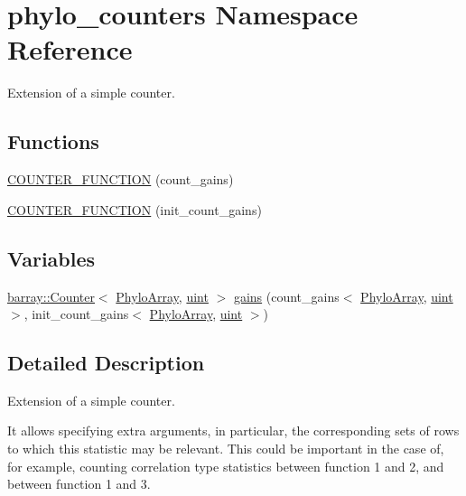 \hypertarget{namespacephylo__counters}{}\section{phylo\+\_\+counters Namespace Reference}
\label{namespacephylo__counters}


Extension of a simple counter.  


\subsection*{Functions}
\begin{DoxyCompactItemize}
\item 
\hyperlink{namespacephylo__counters_ae7974656f9c93f65f6a3fcdbe3ec46b1}{C\+O\+U\+N\+T\+E\+R\+\_\+\+F\+U\+N\+C\+T\+I\+ON} (count\+\_\+gains)
\item 
\hyperlink{namespacephylo__counters_a4f1e25bc98f7010011194140c56c69d5}{C\+O\+U\+N\+T\+E\+R\+\_\+\+F\+U\+N\+C\+T\+I\+ON} (init\+\_\+count\+\_\+gains)
\end{DoxyCompactItemize}
\subsection*{Variables}
\begin{DoxyCompactItemize}
\item 
\hyperlink{classbarray_1_1_counter}{barray\+::\+Counter}$<$ \hyperlink{phylo_8hpp_a607c2e56bbc298034fb841e2e49d15e7}{Phylo\+Array}, \hyperlink{phylo_8hpp_a91ad9478d81a7aaf2593e8d9c3d06a14}{uint} $>$ \hyperlink{namespacephylo__counters_a9f421f66084362533d195b9c05c558fa}{gains} (count\+\_\+gains$<$ \hyperlink{phylo_8hpp_a607c2e56bbc298034fb841e2e49d15e7}{Phylo\+Array}, \hyperlink{phylo_8hpp_a91ad9478d81a7aaf2593e8d9c3d06a14}{uint} $>$, init\+\_\+count\+\_\+gains$<$ \hyperlink{phylo_8hpp_a607c2e56bbc298034fb841e2e49d15e7}{Phylo\+Array}, \hyperlink{phylo_8hpp_a91ad9478d81a7aaf2593e8d9c3d06a14}{uint} $>$)
\end{DoxyCompactItemize}


\subsection{Detailed Description}
Extension of a simple counter. 

It allows specifying extra arguments, in particular, the corresponding sets of rows to which this statistic may be relevant. This could be important in the case of, for example, counting correlation type statistics between function 1 and 2, and between function 1 and 3. 

